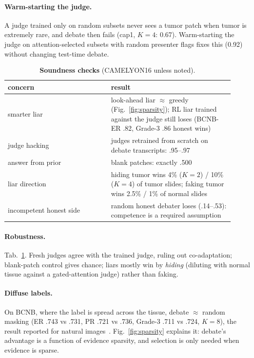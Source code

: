 \documentclass[10pt,twocolumn,letterpaper]{article}
\begin{document}
\paragraph{Warm-starting the judge.} A judge trained only on random subsets never sees a tumor patch when tumor is extremely rare, and debate then fails (cap1, $K{=}4$: 0.67). Warm-starting the judge on attention-selected subsets with random presenter flags fixes this (0.92) without changing test-time debate.

\begin{table}[t]\centering\small
\caption{\textbf{Soundness checks} (CAMELYON16 unless noted).}\label{tab:checks}
\begin{tabular}{@{}p{0.42\linewidth}p{0.5\linewidth}@{}}\toprule
concern & result\\\midrule
smarter liar & look-ahead liar $\approx$ greedy (Fig.~\ref{fig:sparsity}); RL liar trained against the judge still loses (BCNB-ER .82, Grade-3 .86 honest wins)\\
judge hacking & judges retrained from scratch on debate transcripts: .95--.97\\
answer from prior & blank patches: exactly .500\\
liar direction & hiding tumor wins 4\% ($K{=}2$) / 10\% ($K{=}4$) of tumor slides; faking tumor wins 2.5\% / 1\% of normal slides\\
incompetent honest side & random honest debater loses (.14--.53): competence is a required assumption\\\bottomrule
\end{tabular}\end{table}

\paragraph{Robustness.} Tab.~\ref{tab:checks}. Fresh judges agree with the trained judge, ruling out co-adaptation; blank-patch control gives chance; liars mostly win by \emph{hiding} (diluting with normal tissue against a gated-attention judge) rather than faking.

\paragraph{Diffuse labels.} On BCNB, where the label is spread across the tissue, debate $\approx$ random masking (ER .743 vs .731, PR .721 vs .736, Grade-3 .711 vs .724, $K{=}8$), the result reported for natural images~\cite{quantilized_debate}. Fig.~\ref{fig:sparsity} explains it: debate's advantage is a function of evidence sparsity, and selection is only needed when evidence is sparse.
\end{document}
